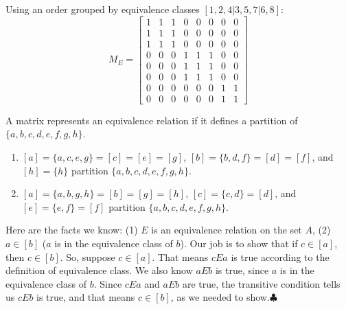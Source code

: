 \begin{Solution}{10.10}
\begin{tasks}
Using an order grouped by equivalence classes $[1,2,4 | 3,5,7 | 6,8]$:
\[
 M_E = \begin{bmatrix}
              1&1&1&0&0&0&0&0 \\
              1&1&1&0&0&0&0&0 \\
              1&1&1&0&0&0&0&0 \\
              0&0&0&1&1&1&0&0 \\
              0&0&0&1&1&1&0&0 \\
              0&0&0&1&1&1&0&0 \\
              0&0&0&0&0&0&1&1 \\
              0&0&0&0&0&0&1&1
            \end{bmatrix}
\]

\end{tasks}
\end{Solution}

\begin{Solution}{10.11}
A matrix represents an equivalence relation if it defines a partition of $\{a,b,c,d,e,f,g,h\}$.
\begin{enumerate}[label=(\alph*)]
\item $[a]=\{a,c,e,g\}=[c]=[e]=[g]$, $[b]=\{b,d,f\}=[d]=[f]$, and  $[h]=\{h\}$ partition $\{a,b,c,d,e,f,g,h\}$.

\item $[a]=\{a,b,g,h\}=[b]=[g]=[h]$, $[c]=\{c,d\}=[d]$, and $[e]=\{e,f\}=[f]$ partition $\{a,b,c,d,e,f,g,h\}$.
\end{enumerate}
\end{Solution}

\begin{Solution}{10.12}
Here are the facts we know: (1) $E$ is an equivalence relation on the set $A$, (2) $a\in [b]$ ($a$ is in the equivalence class of $b$). Our job is to show that if $c\in [a]$, then $c\in [b]$. So, suppose $c\in [a]$. That means $cEa$ is true according to the definition of equivalence class. We also know $aEb$ is true, since $a$ is in the equivalence class of $b$. Since $cEa$ and $aEb$ are true, the transitive condition tells us $cEb$ is true, and that means $c\in [b]$, as we needed to show.$\clubsuit$
\end{Solution}
